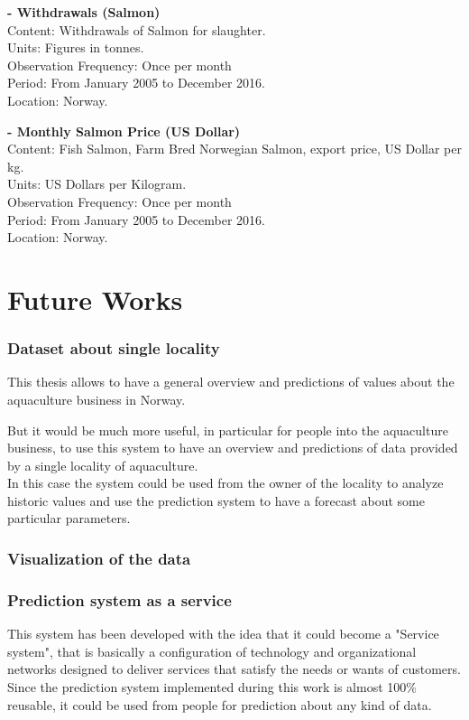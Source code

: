 \textbf{- Withdrawals (Salmon)}
	\\ Content: Withdrawals of Salmon for slaughter. 
	\\ Units: Figures in tonnes.
	\\ Observation Frequency: Once per month
	\\ Period:  From January 2005 to December 2016.
	\\ Location: Norway.


\textbf{- Monthly Salmon Price (US Dollar)}
	\\ Content: Fish Salmon, Farm Bred Norwegian Salmon, export price, US Dollar per kg. 
	\\ Units: US Dollars per Kilogram. 
	\\ Observation Frequency: Once per month
	\\ Period:  From January 2005 to December 2016.
	\\ Location: Norway.
	




\part{Future Works}
\section{Dataset about single locality}
This thesis allows to have a general overview and predictions of values about the aquaculture business in Norway. 

But it would be much more useful, in particular for people into the aquaculture business, to use this system to have an overview and predictions of data provided by a single locality of aquaculture.\\
In this case the system could be used from the owner of the locality to analyze historic values and use the prediction system to have a forecast about some particular parameters.

\section{Visualization of the data}

\newpage

\section{Prediction system as a service}
This system has been developed with the idea that it could become a "Service system", that is basically a configuration of technology and organizational networks designed to deliver services that satisfy the needs or wants of customers.
Since the prediction system implemented during this work is almost 100\% reusable, it could be used from people for prediction about any kind of data. 

